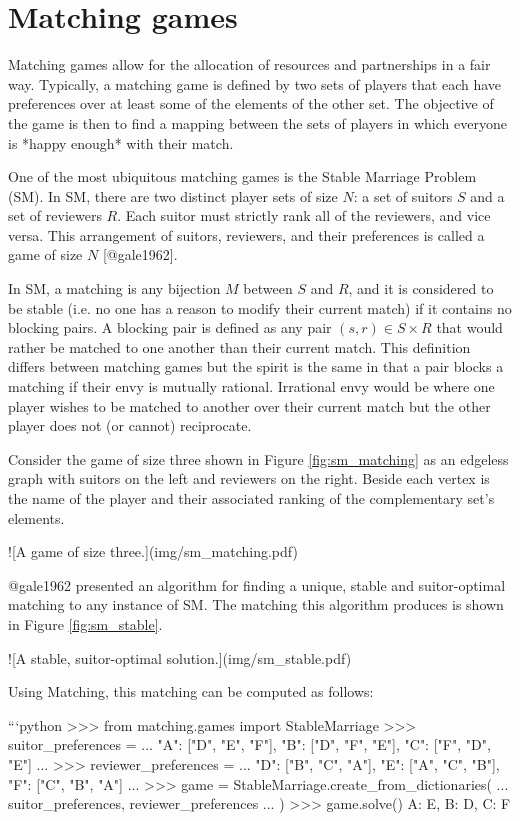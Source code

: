 \chapter{Matching games}
\label{chp:matching}

Matching games allow for the allocation of resources and partnerships in a fair
way. Typically, a matching game is defined by two sets of players that each have
preferences over at least some of the elements of the other set. The objective
of the game is then to find a mapping between the sets of players in which
everyone is *happy enough* with their match.

One of the most ubiquitous matching games is the Stable Marriage Problem
(SM). In SM, there are two distinct player sets of size $N$: a set of suitors
$S$ and a set of reviewers $R$. Each suitor must strictly rank all of the
reviewers, and vice versa. This arrangement of suitors, reviewers, and
their preferences is called a game of size $N$ [@gale1962].

In SM, a matching is any bijection $M$ between $S$ and $R$, and it is considered
to be stable (i.e. no one has a reason to modify their current match) if it
contains no blocking pairs. A blocking pair is defined as any pair $(s, r) \in S
\times R$ that would rather be matched to one another than their current match.
This definition differs between matching games but the spirit is the same in
that a pair blocks a matching if their envy is mutually rational. Irrational
envy would be where one player wishes to be matched to another over their
current match but the other player does not (or cannot) reciprocate.

Consider the game of size three shown in Figure \ref{fig:sm_matching} as an
edgeless graph with suitors on the left and reviewers on the right. Beside each
vertex is the name of the player and their associated ranking of the
complementary set’s elements.

![A game of size three.\label{fig:sm_matching}](img/sm_matching.pdf)

@gale1962 presented an algorithm for finding a unique, stable and suitor-optimal
matching to any instance of SM. The matching this algorithm produces is shown in
Figure \ref{fig:sm_stable}.

![A stable, suitor-optimal solution.\label{fig:sm_stable}](img/sm_stable.pdf)

Using Matching, this matching can be computed as follows:

```python
>>> from matching.games import StableMarriage
>>> suitor_preferences = {
...     "A": ["D", "E", "F"], "B": ["D", "F", "E"], "C": ["F", "D", "E"]
... }
>>> reviewer_preferences = {
...     "D": ["B", "C", "A"], "E": ["A", "C", "B"], "F": ["C", "B", "A"]
... }
>>> game = StableMarriage.create_from_dictionaries(
...     suitor_preferences, reviewer_preferences
... )
>>> game.solve()
{A: E, B: D, C: F}

